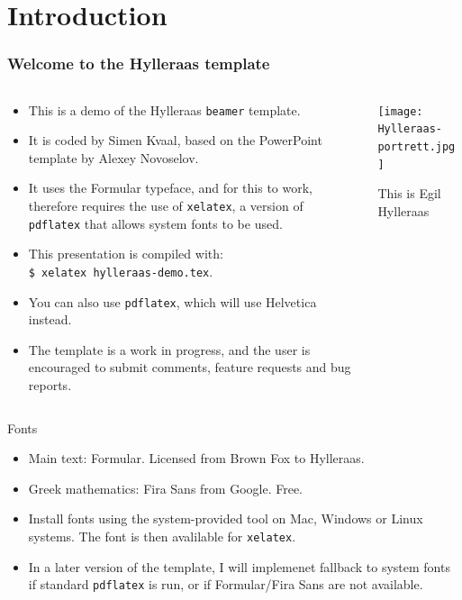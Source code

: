 \documentclass[8pt]{beamer} %
\begin{document}
\section{Introduction}

\begin{frame}
  \frametitle{Welcome to the Hylleraas template}
  \begin{columns}
    \begin{column}{0.5\textwidth}
      \begin{itemize}[<+->]
      \item This is a demo of the Hylleraas \texttt{beamer} template.
      \item It is coded by Simen Kvaal, based on the PowerPoint template by Alexey Novoselov.
      \item It uses the \alert{Formular typeface}, and for this to work, therefore requires the use of \alert{\texttt{xelatex}}, a version of \texttt{pdflatex} that allows system fonts to be used.
      \item This presentation is compiled with:\\ \texttt{\$ xelatex hylleraas-demo.tex}.
      \item You can also use \texttt{pdflatex}, which will use Helvetica instead.
      \item The template is a work in progress, and the user is encouraged to submit comments, feature requests and \alert{bug reports}.
      \end{itemize}
    \end{column}
    \begin{column}{0.5\textwidth}
    \begin{center}
      \begin{measuredfigure}
        \texttt{[image: Hylleraas-portrett.jpg]}
        \caption{This is Egil Hylleraas}
      \end{measuredfigure}
    \end{center}
    \end{column}
  \end{columns}
\end{frame}


\begin{frame}{Fonts}

  \begin{itemize}
  \item  Main text: Formular. Licensed from Brown Fox to Hylleraas.
  \item Greek mathematics: Fira Sans from Google. Free.
  \item Install fonts using the system-provided tool on Mac, Windows or Linux systems. The font is then avalilable for \texttt{xelatex}.
  \item In a later version of the template, I will implemenet fallback to system fonts if standard \texttt{pdflatex} is run, or if Formular/Fira Sans are not available.
  \end{itemize}


\end{frame}
\end{document}

